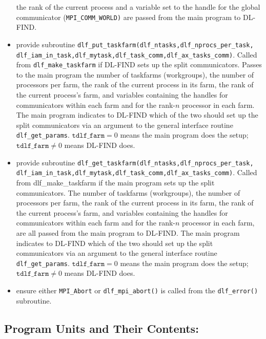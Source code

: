 \documentclass{article}
\begin{document}
\begin{itemize}
      the rank of the current process and a variable set to the handle for the 
      global communicator (\texttt{MPI\_COMM\_WORLD)} are passed from the main program to 
      DL-FIND. 
\item provide subroutine \texttt{dlf\_put\_taskfarm(dlf\_ntasks,dlf\_nprocs\_per\_task, 
      dlf\_iam\_in\_task,dlf\_mytask,dlf\_task\_comm,dlf\_ax\_tasks\_comm)}.
      Called from \texttt{dlf\_make\_taskfarm} if DL-FIND sets up the split communicators.  
      Passes to the main program the number of taskfarms (workgroups), the number of processors per 
      farm, the rank of 
      the current process in its farm, the rank of the current process's farm, and 
      variables containing the handles for communicators within each farm and for the 
      rank-$n$ processor in each farm.  The main program indicates to DL-FIND which of the 
      two should set up the split communicators via an argument to the general interface routine 
      \texttt{dlf\_get\_params}.  $\texttt{tdlf\_farm}=0$ means the main program does the setup; 
      $\texttt{tdlf\_farm}\neq 0$ means DL-FIND does.
\item provide subroutine \texttt{dlf\_get\_taskfarm(dlf\_ntasks,dlf\_nprocs\_per\_task,
      dlf\_iam\_in\_task,dlf\_mytask,dlf\_task\_comm,dlf\_ax\_tasks\_comm)}.
      Called from dlf\_make\_taskfarm if the main program sets up the split communicators.  
      The number of taskfarms (workgroups), the number of processors per farm, the rank of 
      the current process in its farm, the rank of the current process's farm, and 
      variables containing the handles for communicators within each farm and for the 
      rank-$n$ processor in each farm, are all passed from the main program to DL-FIND.
      The main program indicates to DL-FIND which of the
      two should set up the split communicators via an argument to the general interface routine
      \texttt{dlf\_get\_params}.  $\texttt{tdlf\_farm}=0$ means the main program does the setup;
      $\texttt{tdlf\_farm}\neq 0$ means DL-FIND does.
\item ensure either \texttt{MPI\_Abort} or \texttt{dlf\_mpi\_abort()} is called from the 
      \texttt{dlf\_error()} subroutine.
\end{itemize} 

\subsection{Program Units and Their Contents:}
\end{document}
